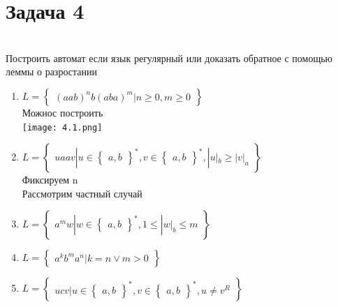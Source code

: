 \documentclass[a4paper]{article}
\begin{document}
\section{Задача 4}
\\ Построить автомат если язык регулярный или доказать обратное с помощью леммы о разростании 
\begin{enumerate}
    \item $L = \begin{Bmatrix}
(aab)^{n}b(aba)^{m} | n\geq 0, m \geq 0
\end{Bmatrix}$
\\ Можнос построить 
\\ \texttt{[image: 4.1.png]}
    \item $L = \begin{Bmatrix}
uaav | u \in \begin{Bmatrix}
a, b
\end{Bmatrix}^{*},v \in \begin{Bmatrix}
a, b
\end{Bmatrix}^{*}, |u|_{b} \geq |v|_{a}
\end{Bmatrix}$
\\ Фиксируем n 
\\ Рассмотрим частный случай 
    \item $L = \begin{Bmatrix}
a^{m}w | w \in \begin{Bmatrix}
a, b
\end{Bmatrix}^{*}, 1 \leq |w|_{b} \leq m
\end{Bmatrix}$
    \item $L = \begin{Bmatrix}
a^{k}b^{m}a^{n} | k = n \vee m > 0
\end{Bmatrix}$
    \item $L = \begin{Bmatrix}
ucv | u \in \begin{Bmatrix}
a, b
\end{Bmatrix}^{*}, v \in \begin{Bmatrix}
a, b
\end{Bmatrix}^{*}, u \neq v^{R}
\end{Bmatrix}$
\end{enumerate}
\end{document}

